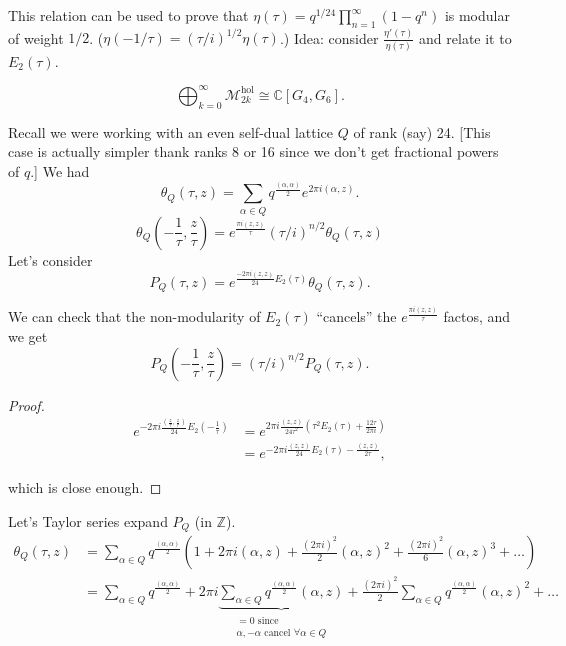 \begin{remark}
\label{remark-bizzare-fact}
This relation can be used to prove that
$\eta(\tau)=q^{1/24}\prod_{n=1}^\infty(1-q^n)$ 
is modular of weight $1/2$.
($\eta(-1/\tau)=(\tau/i)^{1/2}\eta(\tau)$.)
Idea: consider $\frac{\eta'(\tau)}{\eta(\tau)}$ 
and relate it to $E_2(\tau)$.
\end{remark}

\noindent
$$
\bigoplus_{k=0}^\infty\mathcal{M}^{\text{hol}}_{2k}
\cong\mathbb{C}[G_4,G_6].
$$

\medskip\noindent
Recall we were working with an even self-dual lattice $Q$ 
of rank (say) 24. [This case is actually simpler thank
ranks 8 or 16 since we don't get fractional powers of $q$.]
We had
$$
\theta_Q(\tau,z)=\sum_{\alpha \in Q}q^{\frac{(\alpha,\alpha)}{2}}
e^{2\pi i(\alpha,z)}.
$$
$$
\theta_Q\left(-\frac{1}{\tau},\frac{z}{\tau}\right)
=e^{\frac{\pi i (z,z)}{\tau}}(\tau/i)^{n/2}\theta_Q(\tau,z)
$$
Let's consider
$$
P_Q(\tau,z)=e^{\frac{-2\pi i(z,z)}{24}E_2(\tau)}
\theta_Q(\tau,z).
$$

We can check that the non-modularity of $E_2(\tau)$ 
``cancels'' the $e^{\frac{\pi i (z,z)}{\tau}}$ factos,
and we get
$$
P_Q\left(-\frac{1}{\tau},\frac{z}{\tau}\right)=(\tau/i)^{n/2}P_Q(\tau,z).
$$

\begin{proof}
\begin{align*}
e^{-2\pi i \frac{\left(\frac{z}{\tau},\frac{z}{\tau}\right)}{24}
E_2\left(-\frac{1}{\tau}\right)}
&=e^{2\pi i \frac{(z,z)}{24\tau^2}
\left(\tau^2E_2(\tau)+\frac{12\tau}{2\pi i}\right)}\\
&=e^{-2\pi i \frac{(z,z)}{24}E_2(\tau)-\frac{(z,z)}{2\tau}},
\end{align*}

\noindent
which is close enough.
\end{proof}

\medskip\noindent
Let's Taylor series expand $P_Q$ (in $\mathbb{Z}$).
\begin{align*}
\theta_Q(\tau,z)
&=\sum_{\alpha \in Q}q^{\frac{(\alpha,\alpha)}{2}}
\left(1+2\pi i(\alpha,z)
+\frac{(2\pi i)^2}{2}(\alpha,z)^2
+\frac{(2\pi i)^2}{6}(\alpha,z)^3+\ldots\right)\\
&=\sum_{\alpha \in Q}q^{\frac{(\alpha,\alpha)}{2}}
+2\pi i\underbrace{\sum_{\alpha\in Q}q^{\frac{(\alpha,\alpha)}{2}}(\alpha,z)
}_{\substack{=0\text{ since} \\ \alpha,-\alpha\text{ cancel }\forall \alpha \in
Q}}
+\frac{(2\pi i)^2}{2}\sum_{\alpha \in Q}q^{\frac{(\alpha,\alpha)}{2}}
(\alpha,z)^2+\ldots
\end{align*}

